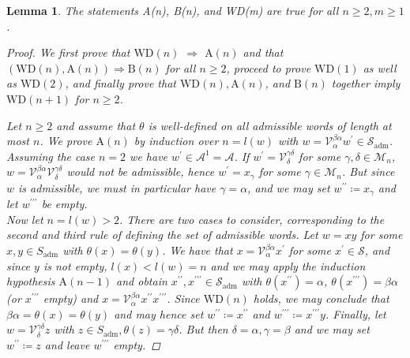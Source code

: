 \documentclass[10pt, a4paper, UKenglish]{article}
\numberwithin{equation}{section}
\newcommand{\cM}{\mathcal{M}}
\newcommand{\cS}{\mathcal{S}}
\newcommand{\cV}{\mathcal{V}}
\newcommand{\cA}{\mathcal{A}}
\newcommand{\defas}{\coloneqq}  %
\theoremstyle{plain}
\newtheorem{lem}[equation]{Lemma}
\theoremstyle{definition}
\begin{document}
\begin{lem}\label{lem_theta_well_defined}
The statements \emph{A(n)}, \emph{B(n)}, and \emph{WD(m)} are true for all $n \geq 2, m \geq 1$.
\begin{proof}
We first prove that $\mathrm{WD}(n)$ $\Rightarrow$ $\mathrm{A}(n)$ and that $(\mathrm{WD}(n), \mathrm{A}(n)) \Rightarrow \mathrm{B}(n)$ for all $n \geq 2$, proceed to prove $\mathrm{WD}(1)$ as well as $\mathrm{WD}(2)$, and finally prove that $\mathrm{WD}(n), \mathrm{A}(n)$, and $\mathrm{B}(n)$ together imply $\mathrm{WD}(n+1)$ for $n \geq 2$.

Let $n \geq 2$ and assume that $\theta$ is well-defined on all admissible words of length at most $n$. We prove $\mathrm{A}(n)$ by induction over $n = l(w)$ with $w = \cV^{\beta\alpha}_\alpha w^\prime \in \cS_{\mathrm{adm}}$.\\
Assuming the case $n = 2$ we have $w^\prime \in \cA^1 = \cA$. If $w^\prime = \cV^{\gamma\delta}_\delta$ for some $\gamma,\delta \in \cM_n$, $w = \cV^{\beta\alpha}_\alpha \cV^{\gamma\delta}_\delta$ would not be admissible, hence $w^\prime = x_\gamma$ for some $\gamma \in \cM_n$. But since $w$ is admissible, we must in particular have $\gamma = \alpha$, and we may set $w^{\prime\prime} \defas x_\gamma$ and let $w^{\prime\prime\prime}$ be empty.\\
Now let $n = l(w) > 2$. There are two cases to consider, corresponding to the second and third rule of defining the set of admissible words. Let $w = xy$ for some $x,y \in S_{\mathrm{adm}}$ with $\theta(x) = \theta(y)$. We have that $x = \cV^{\beta\alpha}_\alpha x^\prime$ for some $x^\prime \in \cS$, and since $y$ is not empty, $l(x) < l(w) = n$ and we may apply the induction hypothesis $\mathrm{A}(n-1)$ and obtain $x^{\prime\prime},x^{\prime\prime\prime} \in \cS_{\mathrm{adm}}$ with $\theta(x^{\prime\prime}) = \alpha$, $\theta(x^{\prime\prime\prime}) = \beta\alpha$ (or $x^{\prime\prime\prime}$ empty) and $x = \cV^{\beta\alpha}_\alpha x^{\prime\prime}x^{\prime\prime\prime}$. Since $\mathrm{WD}(n)$ holds, we may conclude that $\beta\alpha = \theta(x) = \theta(y)$ and may hence set $w^{\prime\prime} \defas x^{\prime\prime}$ and $w^{\prime\prime\prime} \defas x^{\prime\prime\prime} y$. Finally, let $w = \cV^{\gamma\delta}_\delta z$ with $z \in S_{\mathrm{adm}}, \theta(z) = \gamma\delta$. But then $\delta = \alpha, \gamma = \beta$ and we may set $w^{\prime\prime} \defas z$ and leave $w^{\prime\prime\prime}$ empty.


\end{proof}
\end{lem}
\end{document}
